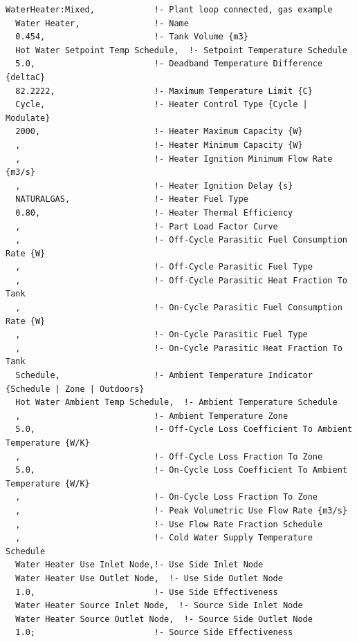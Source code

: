 \begin{lstlisting}
WaterHeater:Mixed,            !- Plant loop connected, gas example
  Water Heater,               !- Name
  0.454,                      !- Tank Volume {m3}
  Hot Water Setpoint Temp Schedule,  !- Setpoint Temperature Schedule
  5.0,                        !- Deadband Temperature Difference {deltaC}
  82.2222,                    !- Maximum Temperature Limit {C}
  Cycle,                      !- Heater Control Type {Cycle | Modulate}
  2000,                       !- Heater Maximum Capacity {W}
  ,                           !- Heater Minimum Capacity {W}
  ,                           !- Heater Ignition Minimum Flow Rate {m3/s}
  ,                           !- Heater Ignition Delay {s}
  NATURALGAS,                 !- Heater Fuel Type
  0.80,                       !- Heater Thermal Efficiency
  ,                           !- Part Load Factor Curve
  ,                           !- Off-Cycle Parasitic Fuel Consumption Rate {W}
  ,                           !- Off-Cycle Parasitic Fuel Type
  ,                           !- Off-Cycle Parasitic Heat Fraction To Tank
  ,                           !- On-Cycle Parasitic Fuel Consumption Rate {W}
  ,                           !- On-Cycle Parasitic Fuel Type
  ,                           !- On-Cycle Parasitic Heat Fraction To Tank
  Schedule,                   !- Ambient Temperature Indicator {Schedule | Zone | Outdoors}
  Hot Water Ambient Temp Schedule,  !- Ambient Temperature Schedule
  ,                           !- Ambient Temperature Zone
  5.0,                        !- Off-Cycle Loss Coefficient To Ambient Temperature {W/K}
  ,                           !- Off-Cycle Loss Fraction To Zone
  5.0,                        !- On-Cycle Loss Coefficient To Ambient Temperature {W/K}
  ,                           !- On-Cycle Loss Fraction To Zone
  ,                           !- Peak Volumetric Use Flow Rate {m3/s}
  ,                           !- Use Flow Rate Fraction Schedule
  ,                           !- Cold Water Supply Temperature Schedule
  Water Heater Use Inlet Node,!- Use Side Inlet Node
  Water Heater Use Outlet Node,  !- Use Side Outlet Node
  1.0,                        !- Use Side Effectiveness
  Water Heater Source Inlet Node,  !- Source Side Inlet Node
  Water Heater Source Outlet Node,  !- Source Side Outlet Node
  1.0;                        !- Source Side Effectiveness


\end{lstlisting}
